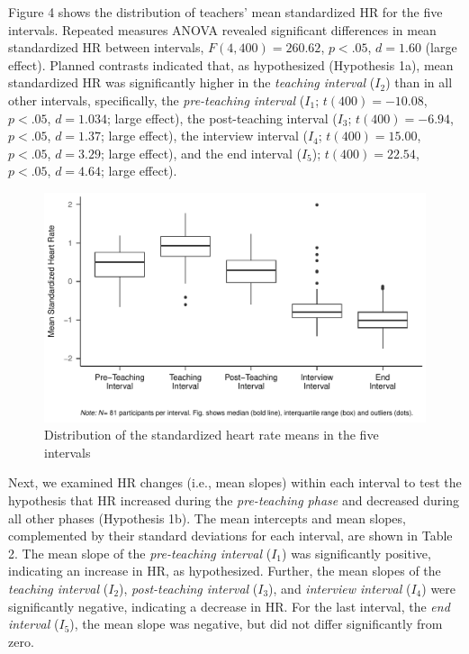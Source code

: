 \documentclass[preprint, 3p,
authoryear]{elsarticle} %
\begin{document}
\newpage

Figure 4 shows the distribution of teachers' mean standardized HR for
the five intervals. Repeated measures ANOVA revealed significant
differences in mean standardized HR between intervals,
\(F(4, 400) = 260.62\), \(p < .05\), \(d = 1.60\) (large effect).
Planned contrasts indicated that, as hypothesized (Hypothesis 1a), mean
standardized HR was significantly higher in the \emph{teaching interval}
(\(I_2\)) than in all other intervals, specifically, the
\emph{pre-teaching interval} (\(I_1\); \(t(400) = -10.08\), \(p < .05\),
\(d = 1.034\); large effect), the post-teaching interval (\(I_3\);
\(t(400) = -6.94\), \(p < .05\), \(d = 1.37\); large effect), the
interview interval (\(I_4\); \(t(400) = 15.00\), \(p < .05\),
\(d = 3.29\); large effect), and the end interval (\(I_5\));
\(t(400) = 22.54\), \(p < .05\), \(d = 4.64\); large effect).

\begin{figure}[H]
  \centering
  \includegraphics[width=1\textwidth]{plots_publication/box_plot.pdf}
  \caption{Distribution of the standardized heart rate means in the five intervals}
  \label{Distribution of the standardized heart rate means in the five intervals}
\end{figure}

Next, we examined HR changes (i.e., mean slopes) within each interval to
test the hypothesis that HR increased during the \emph{pre-teaching
phase} and decreased during all other phases (Hypothesis 1b). The mean
intercepts and mean slopes, complemented by their standard deviations
for each interval, are shown in Table 2. The mean slope of the
\emph{pre-teaching interval} (\(I_1\)) was significantly positive,
indicating an increase in HR, as hypothesized. Further, the mean slopes
of the \emph{teaching interval} (\(I_2\)), \emph{post-teaching interval}
(\(I_3\)), and \emph{interview interval} (\(I_4\)) were significantly
negative, indicating a decrease in HR. For the last interval, the
\emph{end interval} (\(I_5\)), the mean slope was negative, but did not
differ significantly from zero.
\end{document}

